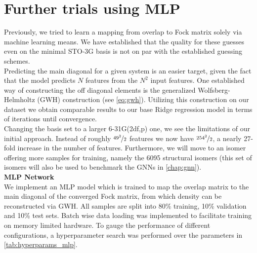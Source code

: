 \section{Further trials using MLP}
\label{sec:further_trials_mlp}
Previously, we tried to learn a mapping from overlap to Fock matrix solely via machine learning means. We have established that the quality for these guesses even on the minimal STO-3G basis is not on par with the established guessing schemes.\\
Predicting the main diagonal for a given system is an easier target, given the fact that the model predicts $N$ features from the $N^2$ input features. One established way of constructing the off diagonal elements is the generalized Wolfsberg-Helmholtz (GWH) construction \parencite{ref:gwh_wolfsberg1952spectra} (see \autoref{eq:gwh}).
Utilizing this construction on our dataset we obtain comparable results to our base Ridge regression model in terms of iterations until convergence. \\
Changing the basis set to a larger 6-31G(2df,p) one, we see the limitations of our initial approach. Instead of roughly $\nicefrac{49^2}{2}$ features we now have $\nicefrac{254^2}{2}$, a nearly 27-fold increase in the number of features. Furthermore, we will move to an isomer offering more samples for training, namely the 6095  structural isomers (this set of isomers will also be used to benchmark the GNNs in \autoref{chap:gnn}).\\

\textbf{MLP Network}\\
We implement an MLP model which is trained to map the overlap matrix to the main diagonal of the converged Fock matrix, from which density can be reconstructed via GWH. All samples are split into 80\% training, 10\% validation and 10\% test sets. Batch wise data loading was implemented to facilitate training on memory limited hardware. To gauge the performance of different configurations, a hyperparameter search was performed over the parameters in \autoref{tab:hyperparams_mlp}.


